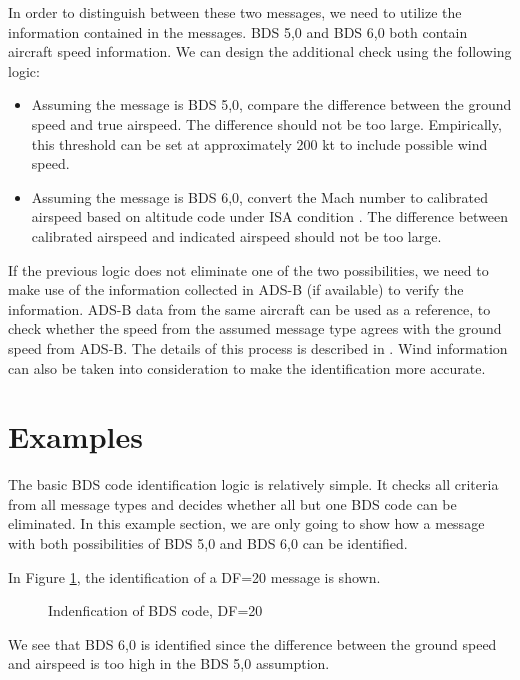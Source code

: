 In order to distinguish between these two messages, we need to utilize the information contained in the messages. BDS 5,0 and BDS 6,0 both contain aircraft speed information. We can design the additional check using the following logic:

\begin{itemize}
    \item Assuming the message is BDS 5,0, compare the difference between the ground speed and true airspeed. The difference should not be too large. Empirically, this threshold can be set at approximately 200 kt to include possible wind speed. 
    \item Assuming the message is BDS 6,0, convert the Mach number to calibrated airspeed based on altitude code under ISA condition \cite{young2017}. The difference between calibrated airspeed and indicated airspeed should not be too large.
\end{itemize}

If the previous logic does not eliminate one of the two possibilities, we need to make use of the information collected in ADS-B (if available) to verify the information. ADS-B data from the same aircraft can be used as a reference, to check whether the speed from the assumed message type agrees with the ground speed from ADS-B. The details of this process is described in \cite{sun2019pymodes}. Wind information can also be taken into consideration to make the identification more accurate.


\section{Examples}

The basic BDS code identification logic is relatively simple. It checks all criteria from all message types and decides whether all but one BDS code can be eliminated. In this example section, we are only going to show how a message with both possibilities of BDS 5,0 and BDS 6,0 can be identified.


In Figure \ref{fig:bds_bds_infer_example_1}, the identification of a DF=20 message is shown. 

\begin{figure}[ht]
\centering

\caption{Indenfication of BDS code, DF=20}
\label{fig:bds_bds_infer_example_1}
\end{figure}

We see that BDS 6,0 is identified since the difference between the ground speed and airspeed is too high in the BDS 5,0 assumption.

